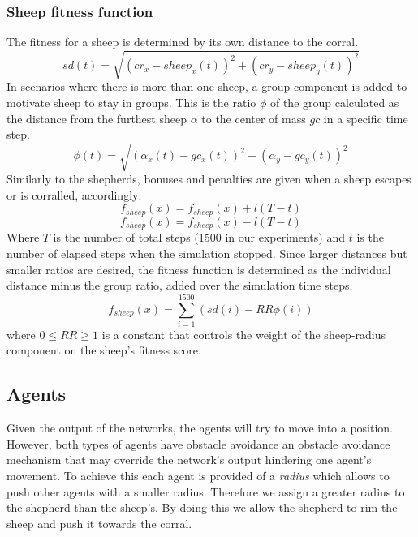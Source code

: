 \documentclass[conference]{IEEEtran}
\begin{document}
\subsubsection{Sheep fitness function}
The fitness for a sheep is determined by its own distance to the corral. 
\begin{equation} \label{eq:sheep_dist}
sd(t) = \sqrt{(cr_x - sheep_x(t))^2 + (cr_y - sheep_y(t))^2}
\end{equation}
In scenarios where there is more than one sheep, a group component is added to motivate sheep to stay in groups. 
This is the ratio $\phi$ of the group calculated as the distance from the furthest sheep $\alpha$ to the center of mass $gc$ in a specific time step. 
\begin{equation} \label{eq:sheep_ratio}
\phi(t) = \sqrt{(\alpha_x(t) - gc_x(t))^2 + (\alpha_y - gc_y(t))^2}
\end{equation}
Similarly to the shepherds, bonuses and penalties are given when a sheep escapes or is corralled, accordingly:
\begin{equation} \label{eq:sheep_bonus}
f_{sheep}(x) = f_{sheep}(x) + l (T - t)
\end{equation}
\begin{equation} \label{eq:sheep_pen}
f_{sheep}(x) = f_{sheep}(x) - l (T - t)
\end{equation}
Where $T$ is the number of total steps (1500 in our experiments) and $t$ is the number of elapsed steps when the simulation stopped.
Since larger distances but smaller ratios are desired, the fitness function is determined as the individual distance minus the group ratio, added over the simulation time steps. 
\begin{equation} \label{eq:sheep_fitness}
f_{sheep}(x) = \sum_{i=1}^{1500}(sd(i) - {RR} \phi(i))
\end{equation}
where $0 \leq RR \geq 1$ is a constant that controls the weight of the sheep-radius component on the sheep's fitness score.


\subsection{Agents}
\label{sec:agents_design}
Given the output of the networks, the agents will try to move into a position.
However, both types of agents have obstacle avoidance an obstacle avoidance mechanism that may override the network's output hindering one agent's movement.
To achieve this each agent is provided of a \textit{radius} which allows to push other agents with a smaller radius.
Therefore we assign a greater radius to the shepherd than the sheep's.
By doing this we allow the shepherd to rim the sheep and push it towards the corral. 
\end{document}
